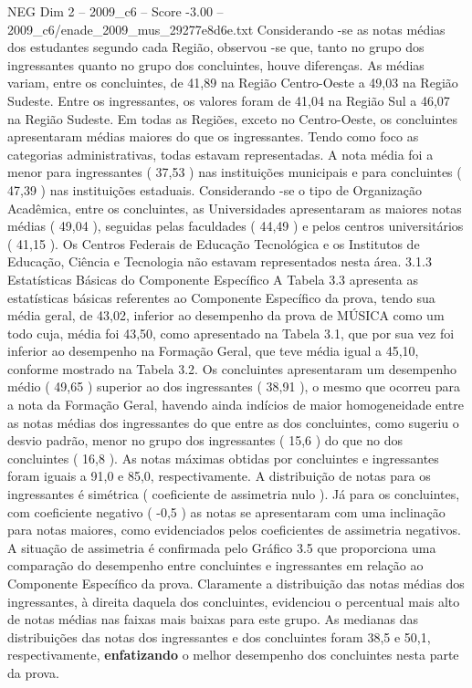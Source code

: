 \begin{textsample}{NEG Dim 2 – 2009\_c6 – Score -3.00 – 2009\_c6/enade\_2009\_mus\_29277e8d6e.txt}
Considerando -se as notas médias dos estudantes segundo cada Região, observou -se que, tanto no grupo dos ingressantes quanto no grupo dos concluintes, houve diferenças.
As médias variam, entre os concluintes, de 41,89 na Região Centro-Oeste a 49,03 na Região Sudeste.
Entre os ingressantes, os valores foram de 41,04 na Região Sul a 46,07 na Região Sudeste.
Em todas as Regiões, exceto no Centro-Oeste, os concluintes apresentaram médias maiores do que os ingressantes.
Tendo como foco as categorias administrativas, todas estavam representadas.
A nota média foi a menor para ingressantes ( 37,53 ) nas instituições municipais e para concluintes ( 47,39 ) nas instituições estaduais.
Considerando -se o tipo de Organização Acadêmica, entre os concluintes, as Universidades apresentaram as maiores notas médias ( 49,04 ), seguidas pelas faculdades ( 44,49 ) e pelos centros universitários ( 41,15 ).
Os Centros Federais de Educação Tecnológica e os Institutos de Educação, Ciência e Tecnologia não estavam representados nesta área. 3.1.3 Estatísticas Básicas do Componente Específico A Tabela 3.3 apresenta as estatísticas básicas referentes ao Componente Específico da prova, tendo sua média geral, de 43,02, inferior ao desempenho da prova de MÚSICA como um todo cuja, média foi 43,50, como apresentado na Tabela 3.1, que por sua vez foi inferior ao desempenho na Formação Geral, que teve média igual a 45,10, conforme mostrado na Tabela 3.2.
Os concluintes apresentaram um desempenho médio ( 49,65 ) superior ao dos ingressantes ( 38,91 ), o mesmo que ocorreu para a nota da Formação Geral, havendo ainda indícios de maior homogeneidade entre as notas médias dos ingressantes do que entre as dos concluintes, como sugeriu o desvio padrão, menor no grupo dos ingressantes ( 15,6 ) do que no dos concluintes ( 16,8 ).
As notas máximas obtidas por concluintes e ingressantes foram iguais a 91,0 e 85,0, respectivamente.
A distribuição de notas para os ingressantes é simétrica ( coeficiente de assimetria nulo ).
Já para os concluintes, com coeficiente negativo ( -0,5 ) as notas se apresentaram com uma inclinação para notas maiores, como evidenciados pelos coeficientes de assimetria negativos.
A situação de assimetria é confirmada pelo Gráfico 3.5 que proporciona uma comparação do desempenho entre concluintes e ingressantes em relação ao Componente Específico da prova.
Claramente a distribuição das notas médias dos ingressantes, à direita daquela dos concluintes, evidenciou o percentual mais alto de notas médias nas faixas mais baixas para este grupo.
As medianas das distribuições das notas dos ingressantes e dos concluintes foram 38,5 e 50,1, respectivamente, \textbf{enfatizando} o melhor desempenho dos concluintes nesta parte da prova.

\end{textsample}
